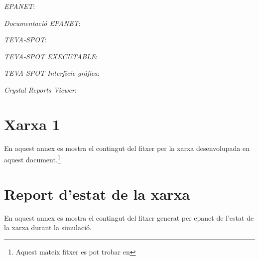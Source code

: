 \documentclass[12pt]{article}
\begin{document}
\clearpage
\begin{thebibliography}{9}
	\textit{EPANET}:
  	\\
  	
  	\textit{Documentació EPANET}:
  	\\
  	
	\textit{TEVA-SPOT}:
  	\\

  	\textit{TEVA-SPOT EXECUTABLE}:
  	\\

	\textit{TEVA-SPOT Interfície gràfica}:
  	\\
  	
	\textit{Crystal Reports Viewer}:
  	\\
\end{thebibliography}

\clearpage
\begin{appendices}
\section{Xarxa 1\label{ann1}}
En aquest annex es mostra el contingut del fitxer per la xarxa desenvolupada en aquest document.\footnote{Aquest mateix fitxer es pot trobar en }


\clearpage
\section{Report d'estat de la xarxa\label{ann2}}
En aquest annex es mostra el contingut del fitxer generat per epanet de l'estat de la xarxa durant la simulació.

\end{appendices}
\end{document}
